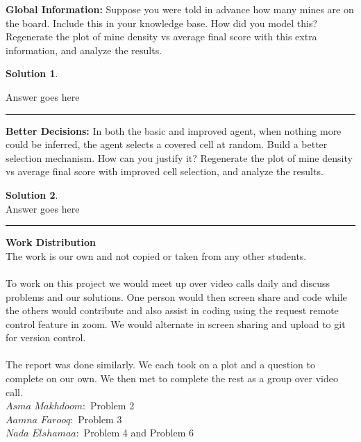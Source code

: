 \documentclass{article}
\theoremstyle{definition}
\def\fline{\rule{0.75\linewidth}{0.5pt}}
\newcommand{\finishline}{\vspace{-15pt}\begin{center}\fline\end{center}}
\newtheorem*{solution*}{Solution}
\newenvironment{solution}{\begin{solution*}}{{\finishline} \end{solution*}}
\begin{document}
\smallskip

\textbf{Global Information: }
	Suppose you were told in advance how many mines are on the board. Include this in your knowledge base. How did you model this? Regenerate the plot of mine density vs average final score with this extra information, and analyze the results.
\begin{solution} \hfill \\
	\begin{figure}[H]
	\centering
	\end{figure}
	Answer goes here
\end{solution}
\smallskip

\textbf{Better Decisions: }
	In both the basic and improved agent, when nothing more could be inferred, the agent selects a covered cell at random. Build a better selection mechanism. How can you justify it? Regenerate the plot of mine density vs average final score with improved cell selection, and analyze the results.
\begin{solution} \hfill \\
    Answer goes here
\end{solution}

\textbf{Work Distribution}
\\
The work is our own and not copied or taken from any other students. 
\\\\
To work on this project we would meet up over video calls daily and discuss problems and our solutions. One person would then screen share and code while the others would contribute and also assist in coding using the request remote control feature in zoom. We would alternate in screen sharing and upload to git for version control. 
\\\\
The report was done similarly. We each took on a plot and a question to complete on our own. We then met to complete the rest as a group over video call. 
\\
$Asma$ $Makhdoom:$ Problem 2
\\
$Aamna$ $Farooq:$ Problem 3
\\
$Nada$ $Elshamaa:$ Problem 4 and Problem 6
\\
\smallskip
\end{document}
